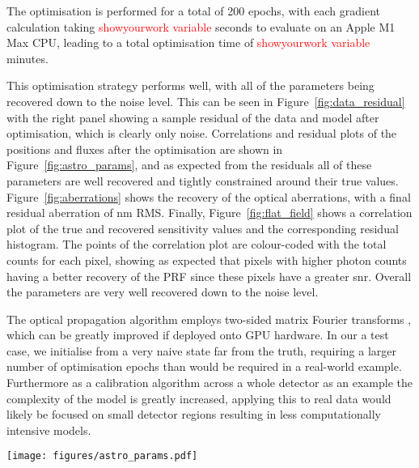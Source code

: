 \documentclass[]{spieman}
\begin{document}
The optimisation is performed for a total of 200 epochs, with each gradient calculation taking \textcolor{red}{showyourwork variable} seconds to evaluate on an Apple M1 Max CPU, leading to a total optimisation time of \textcolor{red}{showyourwork variable} minutes.


This optimisation strategy performs well, with all of the parameters being recovered down to the noise level. This can be seen in Figure~\ref{fig:data_residual} with the right panel showing a sample residual of the data and model after optimisation, which is clearly only noise. Correlations and residual plots of the positions and fluxes after the optimisation are shown in Figure~\ref{fig:astro_params}, and as expected from the residuals all of these parameters are well recovered and tightly constrained around their true values. Figure~\ref{fig:aberrations} shows the recovery of the optical aberrations, with a final residual aberration of  nm RMS. Finally, Figure~\ref{fig:flat_field} shows a correlation plot of the true and recovered sensitivity values and the corresponding residual histogram. The points of the correlation plot are colour-coded with the total counts for each pixel, showing as expected that pixels with higher photon counts having a better recovery of the PRF since these pixels have a greater \ac{snr}. Overall the parameters are very well recovered down to the noise level.


The optical propagation algorithm employs two-sided matrix Fourier transforms \cite{Soummer2007}, which can be greatly improved if deployed onto GPU hardware. In our a test case, we initialise from a very naive state far from the truth, requiring a larger number of optimisation epochs than would be required in a real-world example. Furthermore as a calibration algorithm across a whole detector as an example the complexity of the model is greatly increased, applying this to real data would likely be focused on small detector regions resulting in less computationally intensive models.

\begin{figure*}
    \centering
    \texttt{[image: figures/astro\_params.pdf]}
    \caption{Left: recovery of the individual RA-Dec positions of each star, with the top section showing the correlation between the true and recovered values in units of arcseconds. The bottom section shows the individual residuals for each. Clearly these parameters have been well recovered through the optimisation. Right: the recovery of the flux parameters in units of photons. The top section shows the correlation between the true and recovered values, and the bottom showing the resulting residuals.}
    \label{fig:astro_params}
\end{figure*}
\end{document}
